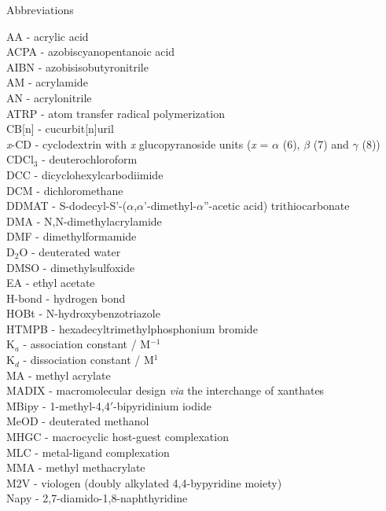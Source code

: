 \documentclass[a4paper,12pt]{report} %
\begin{document}
\newpage
\begin{center}
\Large{Abbreviations}
\end{center}
\noindent
AA - acrylic acid\\
ACPA - azobiscyanopentanoic acid\\
AIBN - azobisisobutyronitrile\\
AM - acrylamide\\
AN - acrylonitrile\\
ATRP - atom transfer radical polymerization\\
CB[n] - cucurbit[n]uril\\
{\it x}-CD - cyclodextrin with {\it x} glucopyranoside units ({\it x} = $\alpha$ (6), $\beta$ (7) and $\gamma$ (8))\\
CDCl$_3$ - deuterochloroform\\
DCC - dicyclohexylcarbodiimide\\
DCM - dichloromethane\\
DDMAT - S-dodecyl-S'-($\alpha$,$\alpha$'-dimethyl-$\alpha$''-acetic acid) trithiocarbonate\\
DMA - N,N-dimethylacrylamide\\
DMF - dimethylformamide\\
D$_2$O - deuterated water\\
DMSO - dimethylsulfoxide\\
EA - ethyl acetate\\
H-bond - hydrogen bond\\
HOBt - N-hydroxybenzotriazole\\
HTMPB - hexadecyltrimethylphosphonium bromide\\
K$_a$ - association constant / M$^{-1}$\\
K$_d$ - dissociation constant / M$^{1}$\\
MA - methyl acrylate\\
MADIX - macromolecular design {\it via} the interchange of xanthates\\
MBipy - 1-methyl-4,4$'$-bipyridinium iodide\\
MeOD - deuterated methanol\\
MHGC - macrocyclic host-guest complexation\\
MLC - metal-ligand complexation\\
MMA - methyl methacrylate\\
M2V - viologen (doubly alkylated 4,4-bypyridine moiety)\\
Napy - 2,7-diamido-1,8-naphthyridine\\
\end{document}
